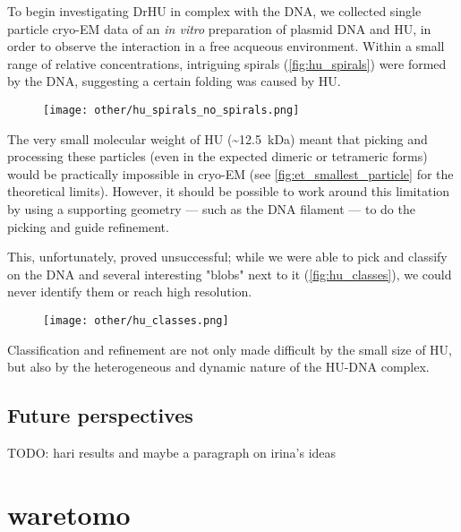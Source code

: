 To begin investigating DrHU in complex with the DNA, we collected single particle cryo-EM data of an \textit{in vitro} preparation of plasmid DNA and HU, in order to observe the interaction in a free acqueous environment.
Within a small range of relative concentrations, intriguing spirals (\autoref{fig:hu_spirals}) were formed by the DNA, suggesting a certain folding was caused by HU.

\begin{figure}[ht]
    \centering
    \texttt{[image: other/hu\_spirals\_no\_spirals.png]}
    \label{fig:hu_spirals}
\end{figure}

The very small molecular weight of HU (\sim\qty{12.5}{\kilo\dalton}) meant that picking and processing these particles (even in the expected dimeric or tetrameric forms) would be practically impossible in cryo-EM (see \autoref{fig:et_smallest_particle} for the theoretical limits).
However, it should be possible to work around this limitation by using a supporting geometry --- such as the DNA filament --- to do the picking and guide refinement.

This, unfortunately, proved unsuccessful; while we were able to pick and classify on the DNA and several interesting "blobs" next to it (\autoref{fig:hu_classes}), we could never identify them or reach high resolution.

\begin{figure}[ht]
    \centering
    \texttt{[image: other/hu\_classes.png]}
    \label{fig:hu_classes}
\end{figure}

Classification and refinement are not only made difficult by the small size of HU, but also by the heterogeneous and dynamic nature of the HU-DNA complex.

\subsection{Future perspectives}

TODO: hari results and maybe a paragraph on irina's ideas

\section{waretomo}

